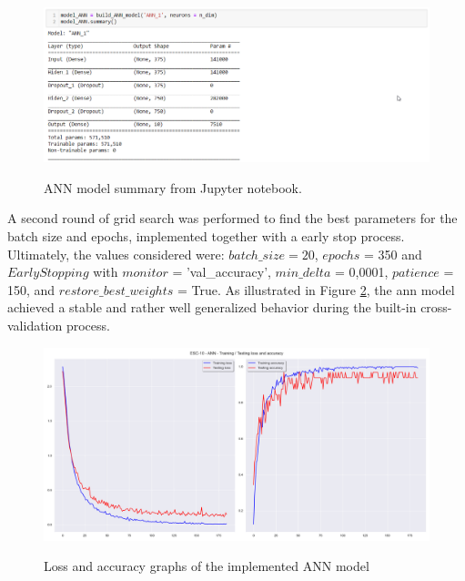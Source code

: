 \begin{figure}[htbp]
    \raggedright
        \caption{ANN model summary from Jupyter notebook.}
        \includegraphics[width=1\textwidth]{resources/images/050-methods/Methods_training_ANN_architecture_jupyter_notebook.png}
        \label{fig:methods_training_ANN_architecture_jupyter_notebook}
\end{figure} 


A second round of grid search was performed to find the best parameters for the batch size and epochs, implemented together with a early stop process. Ultimately, the values considered were: $batch\_size = 20$, $epochs$ = 350 and $EarlyStopping$ with $monitor$ = 'val\_accuracy', $min\_delta$ = 0,0001, $patience$ = 150, and $restore\_best\_weights$ = True. As illustrated in Figure \ref{fig:methods_training_ANN_loss_and_accuracy_graphs}, the \gls{ann} model achieved a stable and rather well generalized behavior during the built-in cross-validation process.


\begin{figure}[htbp]
    \raggedright
        \caption{Loss and accuracy graphs of the implemented ANN model}
        \includegraphics[width=1\textwidth]{resources/images/050-methods/Methods_training_ANN_loss_accuracy.png}
        \label{fig:methods_training_ANN_loss_and_accuracy_graphs}
\end{figure} 

